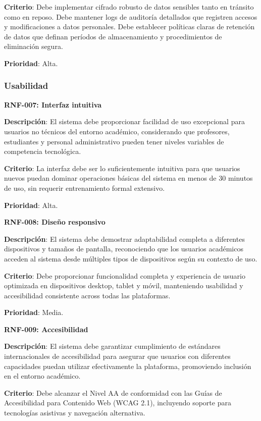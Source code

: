\documentclass[12pt,a4paper,oneside]{report}
\begin{document}
\textbf{Criterio}: Debe implementar cifrado robusto de datos sensibles tanto en tránsito como en reposo. Debe mantener logs de auditoría detallados que registren accesos y modificaciones a datos personales. Debe establecer políticas claras de retención de datos que definan períodos de almacenamiento y procedimientos de eliminación segura.

\textbf{Prioridad}: Alta.

\subsubsection{Usabilidad}\label{usabilidad}

\textbf{RNF-007: Interfaz intuitiva}

\textbf{Descripción}: El sistema debe proporcionar facilidad de uso excepcional para usuarios no técnicos del entorno académico, considerando que profesores, estudiantes y personal administrativo pueden tener niveles variables de competencia tecnológica.

\textbf{Criterio}: La interfaz debe ser lo suficientemente intuitiva para que usuarios nuevos puedan dominar operaciones básicas del sistema en menos de 30 minutos de uso, sin requerir entrenamiento formal extensivo.

\textbf{Prioridad}: Alta.

\textbf{RNF-008: Diseño responsivo}

\textbf{Descripción}: El sistema debe demostrar adaptabilidad completa a diferentes dispositivos y tamaños de pantalla, reconociendo que los usuarios académicos acceden al sistema desde múltiples tipos de dispositivos según su contexto de uso.

\textbf{Criterio}: Debe proporcionar funcionalidad completa y experiencia de usuario optimizada en dispositivos desktop, tablet y móvil, manteniendo usabilidad y accesibilidad consistente across todas las plataformas.

\textbf{Prioridad}: Media.

\textbf{RNF-009: Accesibilidad}

\textbf{Descripción}: El sistema debe garantizar cumplimiento de estándares internacionales de accesibilidad para asegurar que usuarios con diferentes capacidades puedan utilizar efectivamente la plataforma, promoviendo inclusión en el entorno académico.

\textbf{Criterio}: Debe alcanzar el Nivel AA de conformidad con las Guías de Accesibilidad para Contenido Web (WCAG 2.1), incluyendo soporte para tecnologías asistivas y navegación alternativa.
\end{document}
